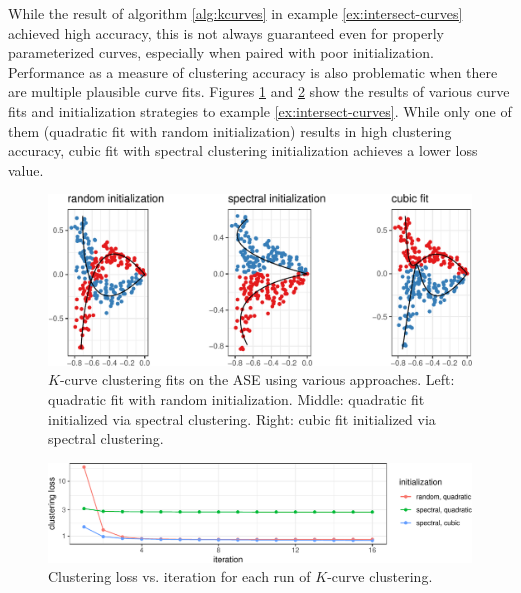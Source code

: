 \documentclass[
  12pt,
]{article}
\theoremstyle{definition}
\theoremstyle{definition}
\theoremstyle{definition}
\theoremstyle{definition}
\theoremstyle{remark}
\begin{document}
While the result of algorithm \ref{alg:kcurves} in example \ref{ex:intersect-curves} achieved high accuracy, this is not always guaranteed even for properly parameterized curves, especially when paired with poor initialization.
Performance as a measure of clustering accuracy is also problematic when there are multiple plausible curve fits.
Figures \ref{fig:multifit} and \ref{fig:loss} show the results of various curve fits and initialization strategies to example \ref{ex:intersect-curves}.
While only one of them (quadratic fit with random initialization) results in high clustering accuracy, cubic fit with spectral clustering initialization achieves a lower loss value.

\begin{figure}[H]

{\centering \includegraphics{draft_files/figure-latex/multifit-1} 

}

\caption{$K$-curve clustering fits on the ASE using various approaches. Left: quadratic fit with random initialization. Middle: quadratic fit initialized via spectral clustering. Right: cubic fit initialized via spectral clustering.}\label{fig:multifit}
\end{figure}

\begin{figure}[H]

{\centering \includegraphics{draft_files/figure-latex/loss-1} 

}

\caption{Clustering loss vs. iteration for each run of $K$-curve clustering.}\label{fig:loss}
\end{figure}
\end{document}

